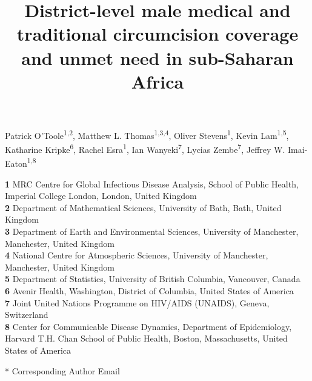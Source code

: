 \documentclass{article}
\title{District-level male medical and traditional circumcision coverage and unmet need in sub-Saharan Africa}
\author{}
\date{}
\begin{document}

\maketitle

\vspace{-1cm}

Patrick O'Toole\textsuperscript{1,2},
Matthew L. Thomas\textsuperscript{1,3,4},
Oliver Stevens\textsuperscript{1},
Kevin Lam\textsuperscript{1,5},
Katharine Kripke\textsuperscript{6},
Rachel Esra\textsuperscript{1},
Ian Wanyeki\textsuperscript{7},
Lycias Zembe\textsuperscript{7},
Jeffrey W. Imai-Eaton\textsuperscript{1,8} \\
\smallskip

\textbf{1} MRC Centre for Global Infectious Disease Analysis, School of Public Health, Imperial College London, London, United Kingdom\\
\textbf{2} Department of Mathematical Sciences, University of Bath, Bath, United Kingdom\\
\textbf{3} Department of Earth and Environmental Sciences, University of Manchester, Manchester, United Kingdom\\
\textbf{4} National Centre for Atmospheric Sciences, University of Manchester, Manchester, United Kingdom\\
\textbf{5} Department of Statistics, University of British Columbia, Vancouver, Canada\\
\textbf{6} Avenir Health, Washington, District of Columbia, United States of America\\
\textbf{7} Joint United Nations Programme on HIV/AIDS (UNAIDS), Geneva, Switzerland\\
\textbf{8} Center for Communicable Disease Dynamics, Department of Epidemiology, Harvard T.H. Chan School of Public Health, Boston, Massachusetts, United States of America\\

\smallskip

* Corresponding Author Email

\clearpage


\end{document}
